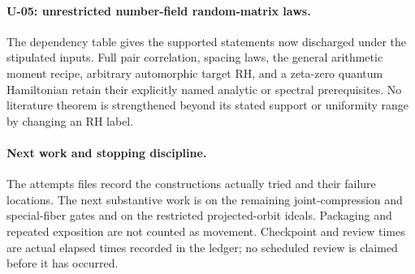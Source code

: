 \paragraph{U-05: unrestricted number-field random-matrix laws.}
The dependency table gives the supported statements now discharged under the stipulated inputs. Full pair correlation, spacing laws, the general arithmetic moment recipe, arbitrary automorphic target RH, and a zeta-zero quantum Hamiltonian retain their explicitly named analytic or spectral prerequisites. No literature theorem is strengthened beyond its stated support or uniformity range by changing an RH label.

\paragraph{Next work and stopping discipline.}
The attempts files record the constructions actually tried and their failure locations. The next substantive work is on the remaining joint-compression and special-fiber gates and on the restricted projected-orbit ideals. Packaging and repeated exposition are not counted as movement. Checkpoint and review times are actual elapsed times recorded in the ledger; no scheduled review is claimed before it has occurred.
